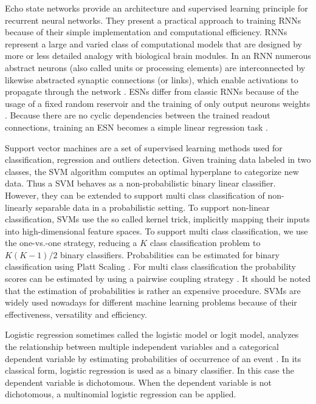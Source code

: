 \documentclass[a4paper,11pt,oneside]{article}
\begin{document}
Echo state networks provide an architecture and supervised learning principle for recurrent
neural networks. They present a practical approach to training RNNs because of their simple implementation 
and computational efficiency. RNNs represent a large and varied class of computational models that are designed 
by more or less detailed analogy with biological brain modules. In an RNN numerous abstract neurons (also called units
or processing elements) are interconnected by likewise abstracted synaptic connections (or links), 
which enable activations to propagate through the network \cite{LUKO}.
ESNs differ from classic RNNs because of the usage of a fixed random reservoir
and the training of only output neurons weights \cite{spedia}. Because there are no cyclic dependencies between the trained readout connections, 
training an ESN becomes a simple linear regression task \cite{Jaeger78}.

Support vector machines are a set of supervised learning methods used for classification, regression and 
outliers detection. Given training data labeled in two classes, the SVM algorithm computes an optimal hyperplane to categorize
new data. Thus a SVM behaves as a non-probabilistic binary linear classifier. However, they can be extended to support multi 
class classification of non-linearly separable data in a probabilistic setting. 
To support non-linear classification, SVMs use the so called kernel trick, implicitly mapping their inputs into high-dimensional feature spaces. 
To support multi class classification, we use the one-vs.-one strategy, reducing a $K$ class classification problem to $K(K-1)/2$ binary classifiers.
Probabilities can be estimated for binary classification using Platt Scaling \cite{platt1999probabilistic}. For multi class
classification the probability scores can be estimated by using a pairwise coupling strategy \cite{wu2004probability}.
It should be noted that the estimation of probabilities is rather an expensive procedure.
SVMs are widely used nowadays for different machine learning problems because of their effectiveness, versatility and efficiency.

Logistic regression sometimes called the logistic model or logit model, analyzes the relationship between
multiple independent variables and a categorical dependent variable by estimating probabilities of occurrence
of an event \cite{park2013introduction}. In its classical form, logistic regression is used as a binary classifier. In this case the 
dependent variable is dichotomous. When the dependent variable is not dichotomous, a multinomial logistic
regression can be applied. 
\end{document}
